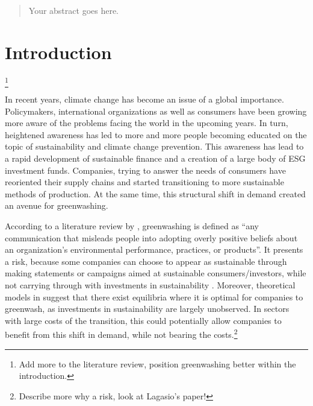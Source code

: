 \documentclass[12pt]{article}
\author{Your Name}
\date{Date of submission: \today}
\begin{document}

\pagebreak
{}

\begin{abstract}
Your abstract goes here.


\end{abstract}
\pagebreak

\tableofcontents
\listoffigures
\listoftables
\pagebreak

\setcounter{page}{1}

\section{Introduction}\label{sect:introduction}\footnote{Add more to the literature review, position greenwashing better within the introduction.}

In recent years, climate change has become an issue of a global importance. Policymakers, international 
organizations as well as consumers have been growing more aware of the problems facing the world in the upcoming years. In turn, heightened awareness has led to more and more people becoming educated on the topic of sustainability and climate change prevention. This awareness has lead to a rapid development of sustainable finance and a creation of a large body of ESG investment funds. Companies, trying to answer the needs of consumers have reoriented their supply chains and started transitioning to more sustainable methods of production. At the same time, this structural shift in demand created an avenue for greenwashing. 

According to a literature review by \textcite{lyonMeansEndGreenwash2015}, greenwashing is defined as ``any communication that misleads  people into adopting overly positive beliefs about an organization's  environmental performance, practices, or products''. It presents a risk, because some companies can choose to appear as sustainable through making statements or campaigns aimed at sustainable consumers/investors, while not carrying through with investments in sustainability \parencite{barrageAdvertisingEnvironmentalStewardship2020, marquisScrutinyNormsSelective2016, kimGreenwashVsBrownwash2015}. Moreover, theoretical models in \textcite{wuBadGreenwashingGood2020,  cartellierCanInvestorsCurb2023} suggest that there exist equilibria where it is optimal for companies to greenwash, as investments in sustainability are largely unobserved. In sectors with large costs of the transition, this could potentially allow companies to benefit from this shift in demand, while not bearing the costs.\footnote{Describe more why a risk, look at Lagasio's paper!}
\end{document}
